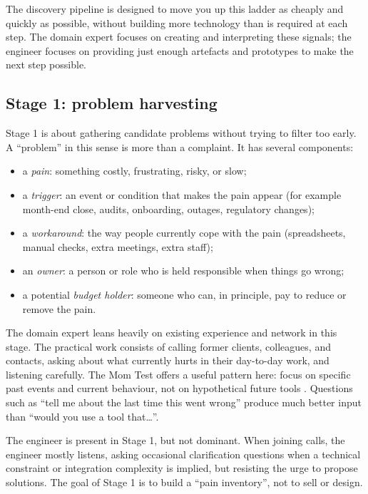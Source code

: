 \documentclass[10pt, a4paper, twocolumn]{article} %
\begin{document}
The discovery pipeline is designed to move you up this ladder as cheaply and quickly as possible, without building more technology than is required at each step. The domain expert focuses on creating and interpreting these signals; the engineer focuses on providing just enough artefacts and prototypes to make the next step possible.

\subsection{Stage 1: problem harvesting}

Stage 1 is about gathering candidate problems without trying to filter too early. A ``problem'' in this sense is more than a complaint. It has several components:

\begin{itemize}
  \item a \emph{pain}: something costly, frustrating, risky, or slow;
  \item a \emph{trigger}: an event or condition that makes the pain appear (for example month-end close, audits, onboarding, outages, regulatory changes);
  \item a \emph{workaround}: the way people currently cope with the pain (spreadsheets, manual checks, extra meetings, extra staff);
  \item an \emph{owner}: a person or role who is held responsible when things go wrong;
  \item a potential \emph{budget holder}: someone who can, in principle, pay to reduce or remove the pain.
\end{itemize}

The domain expert leans heavily on existing experience and network in this stage. The practical work consists of calling former clients, colleagues, and contacts, asking about what currently hurts in their day-to-day work, and listening carefully. The Mom Test offers a useful pattern here: focus on specific past events and current behaviour, not on hypothetical future tools \citep{fitzpatrick2013mom}. Questions such as “tell me about the last time this went wrong” produce much better input than “would you use a tool that\ldots”.

The engineer is present in Stage 1, but not dominant. When joining calls, the engineer mostly listens, asking occasional clarification questions when a technical constraint or integration complexity is implied, but resisting the urge to propose solutions. The goal of Stage 1 is to build a ``pain inventory'', not to sell or design.
\end{document}

